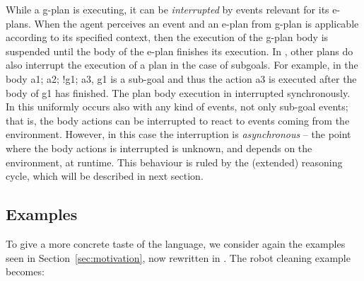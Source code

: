 %
%
%


While a g-plan is executing, it can be \emph{interrupted} by events
relevant for its e-plans. When the agent perceives an event and an
e-plan from g-plan is applicable according to its specified context,
then the execution of the g-plan body is suspended until the body of
the e-plan finishes its execution.
%
In {\asl}, other plans do also interrupt the execution of a plan in
the case of subgoals. For example, in the body \textsf{a1; a2; !g1;
  a3}, \textsf{g1} is a sub-goal and thus the action \textsf{a3} is
executed after the body of \textsf{g1} has finished. The plan body
execution in interrupted synchronously.
%
In {\aser} this uniformly occurs also with any kind of events, not
only sub-goal events; that is, the body actions can be interrupted to
react to events coming from the environment. However, in this case the
interruption is \emph{asynchronous} -- the point where the body
actions is interrupted is unknown, and depends on the environment, at
runtime.
%
This behaviour is ruled by the (extended) reasoning cycle, which will
be described in next section.


%
\subsection{Examples}
To give a more concrete taste of the language, we consider again the
examples seen in Section~\ref{sec:motivation}, now rewritten in
{\aser}.
%
The robot cleaning example becomes:

